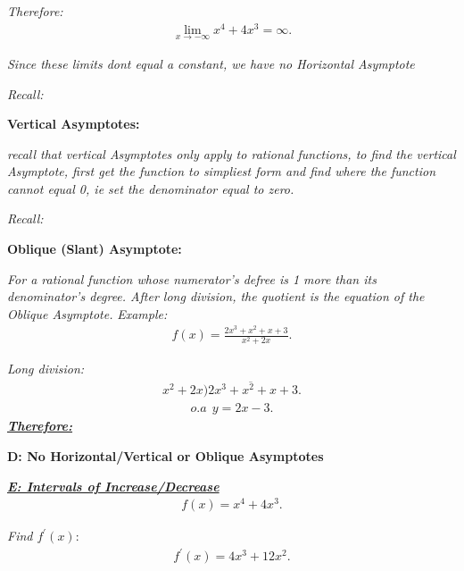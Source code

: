 \documentclass{report}
\begin{document}
  \bigbreak \noindent 
  \textit{Therefore:}
  \begin{align*}
    \boxed{\lim_{x \to -\infty}{x^{4}+4x^{3}} = \infty}
  .\end{align*}

  \bigbreak \noindent 
  \textit{Since these limits dont equal a constant, we have no Horizontal Asymptote}

  \bigbreak \noindent 
  \textit{Recall:}
  \begin{center}
    \textbf{Vertical Asymptotes:}
  \end{center}
  \bigbreak \noindent 
  \textit{recall that vertical Asymptotes only apply to rational functions, to find the vertical Asymptote, first get the function
    to simpliest form and find where the function cannot equal 0, ie set the denominator equal to zero.
  }

  \bigbreak \noindent 
  \textit{Recall:}
  \begin{center}
    \textbf{Oblique (Slant) Asymptote:}
  \end{center}
  \bigbreak \noindent 
  \textit{For a rational function whose numerator's defree is 1 more than its denominator's degree. After
    long division, the quotient is the equation of the Oblique Asymptote.
  }
  \bigbreak \noindent 
  \textit{Example:}
  \begin{align*}
    f(x) = \frac{2x^{3} + x^{2} + x +3}{x^{2} + 2x}
  .\end{align*}

  \bigbreak \noindent 
  \textit{Long division:}
  \begin{align*}
    x^{2}+2x \overline{)2x^{3}+x^{2}+x+3}
  .\end{align*}
  \bigbreak \noindent 
  \begin{align*}
    o.a\:\ y= 2x-3
  .\end{align*}
  \bigbreak \noindent 
  \bigbreak \noindent 
  \textbf{\textit{\underline{Therefore:}}}
  \begin{center}
    \textbf{D: No Horizontal/Vertical or Oblique Asymptotes}
  \end{center}

  \bigbreak \noindent \bigbreak \noindent 
  \textbf{\textit{\underline{E: Intervals of Increase/Decrease}}}
  \begin{align*}
    f(x) = x^{4} + 4x^{3}
  .\end{align*}

  \bigbreak \noindent 
  \textit{Find $f^{\prime}(x)$}:
  \begin{align*}
    f^{\prime}(x) = 4x^{3} + 12x^{2}
  .\end{align*}
\end{document}
